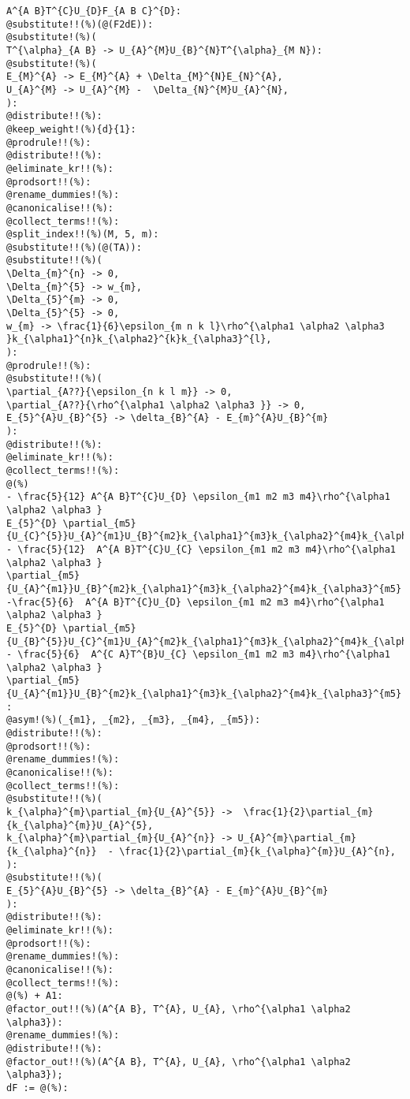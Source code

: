 \documentclass[11pt]{article}
\begin{document}
{\color[named]{Blue}\begin{verbatim}
A^{A B}T^{C}U_{D}F_{A B C}^{D}:
@substitute!!(%)(@(F2dE)):
@substitute!(%)(
T^{\alpha}_{A B} -> U_{A}^{M}U_{B}^{N}T^{\alpha}_{M N}):
@substitute!(%)(
E_{M}^{A} -> E_{M}^{A} + \Delta_{M}^{N}E_{N}^{A},
U_{A}^{M} -> U_{A}^{M} -  \Delta_{N}^{M}U_{A}^{N},
):
@distribute!!(%):
@keep_weight!(%){d}{1}:
@prodrule!!(%):
@distribute!!(%):
@eliminate_kr!!(%):
@prodsort!!(%):
@rename_dummies!(%):
@canonicalise!!(%):
@collect_terms!!(%):
@split_index!!(%)(M, 5, m):
@substitute!!(%)(@(TA)):
@substitute!!(%)(
\Delta_{m}^{n} -> 0,
\Delta_{m}^{5} -> w_{m},
\Delta_{5}^{m} -> 0,
\Delta_{5}^{5} -> 0,
w_{m} -> \frac{1}{6}\epsilon_{m n k l}\rho^{\alpha1 \alpha2 \alpha3 }k_{\alpha1}^{n}k_{\alpha2}^{k}k_{\alpha3}^{l},
):
@prodrule!!(%):
@substitute!!(%)(
\partial_{A??}{\epsilon_{n k l m}} -> 0,
\partial_{A??}{\rho^{\alpha1 \alpha2 \alpha3 }} -> 0,
E_{5}^{A}U_{B}^{5} -> \delta_{B}^{A} - E_{m}^{A}U_{B}^{m}
):
@distribute!!(%):
@eliminate_kr!!(%):
@collect_terms!!(%):
@(%) 
- \frac{5}{12} A^{A B}T^{C}U_{D} \epsilon_{m1 m2 m3 m4}\rho^{\alpha1 \alpha2 \alpha3 }
E_{5}^{D} \partial_{m5}{U_{C}^{5}}U_{A}^{m1}U_{B}^{m2}k_{\alpha1}^{m3}k_{\alpha2}^{m4}k_{\alpha3}^{m5}
- \frac{5}{12}  A^{A B}T^{C}U_{C} \epsilon_{m1 m2 m3 m4}\rho^{\alpha1 \alpha2 \alpha3 }
\partial_{m5}{U_{A}^{m1}}U_{B}^{m2}k_{\alpha1}^{m3}k_{\alpha2}^{m4}k_{\alpha3}^{m5}
-\frac{5}{6}  A^{A B}T^{C}U_{D} \epsilon_{m1 m2 m3 m4}\rho^{\alpha1 \alpha2 \alpha3 }
E_{5}^{D} \partial_{m5}{U_{B}^{5}}U_{C}^{m1}U_{A}^{m2}k_{\alpha1}^{m3}k_{\alpha2}^{m4}k_{\alpha3}^{m5}
- \frac{5}{6}  A^{C A}T^{B}U_{C} \epsilon_{m1 m2 m3 m4}\rho^{\alpha1 \alpha2 \alpha3 }
\partial_{m5}{U_{A}^{m1}}U_{B}^{m2}k_{\alpha1}^{m3}k_{\alpha2}^{m4}k_{\alpha3}^{m5}
:
@asym!(%)(_{m1}, _{m2}, _{m3}, _{m4}, _{m5}):
@distribute!!(%):
@prodsort!!(%):
@rename_dummies!(%):
@canonicalise!!(%):
@collect_terms!!(%):
@substitute!!(%)(
k_{\alpha}^{m}\partial_{m}{U_{A}^{5}} ->  \frac{1}{2}\partial_{m}{k_{\alpha}^{m}}U_{A}^{5},
k_{\alpha}^{m}\partial_{m}{U_{A}^{n}} -> U_{A}^{m}\partial_{m}{k_{\alpha}^{n}}  - \frac{1}{2}\partial_{m}{k_{\alpha}^{m}}U_{A}^{n},
):
@substitute!!(%)(
E_{5}^{A}U_{B}^{5} -> \delta_{B}^{A} - E_{m}^{A}U_{B}^{m}
):
@distribute!!(%):
@eliminate_kr!!(%):
@prodsort!!(%):
@rename_dummies!(%):
@canonicalise!!(%):
@collect_terms!!(%):
@(%) + A1:
@factor_out!!(%)(A^{A B}, T^{A}, U_{A}, \rho^{\alpha1 \alpha2 \alpha3}):
@rename_dummies!(%):
@distribute!!(%):
@factor_out!!(%)(A^{A B}, T^{A}, U_{A}, \rho^{\alpha1 \alpha2 \alpha3});
dF := @(%):
\end{verbatim}}
\end{document}
